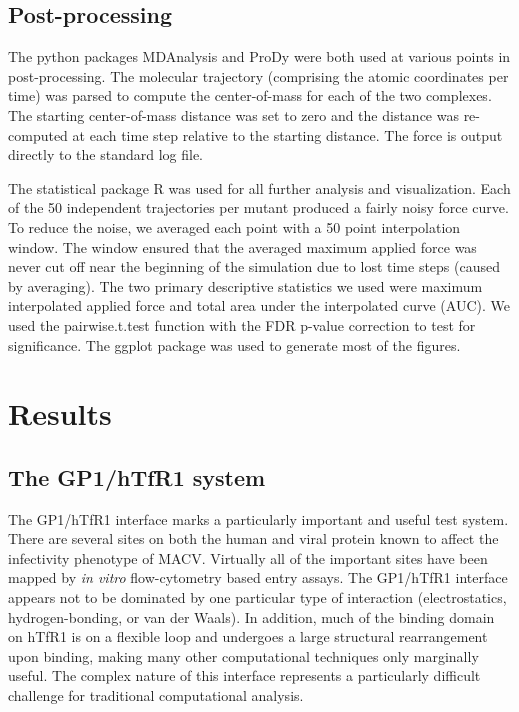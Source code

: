 \documentclass[12pt]{article}
\begin{document}
\subsection*{Post-processing}

The python packages MDAnalysis \citep{Agrawal2011} and ProDy \citep{Bakan2011} were both used at various points in post-processing. The molecular trajectory (comprising the atomic coordinates per time) was parsed to compute the center-of-mass for each of the two complexes. The starting center-of-mass distance was set to zero and the distance was re-computed at each time step relative to the starting distance. The force is output directly to the standard log file.

The statistical package R was used for all further analysis and visualization. Each of the 50 independent trajectories per mutant produced a fairly noisy force curve. To reduce the noise, we averaged each point with a 50 point interpolation window. The window ensured that the averaged maximum applied force was never cut off near the beginning of the simulation due to lost time steps (caused by averaging). The two primary descriptive statistics we used were maximum interpolated applied force and total area under the interpolated curve (AUC). We used the pairwise.t.test function with the FDR p-value correction to test for significance. The ggplot \citep{ggplot} package was used to generate most of the figures. 

\section*{Results}

\subsection*{The GP1/hTfR1 system}
The GP1/hTfR1 interface marks a particularly important and useful test system. There are several sites on both the human and viral protein known to affect the infectivity phenotype of MACV. Virtually all of the important sites have been mapped by \textit{in vitro} flow-cytometry based entry assays. The GP1/hTfR1 interface appears not to be dominated by one particular type of interaction (electrostatics, hydrogen-bonding, or van der Waals). In addition, much of the binding domain on hTfR1 is on a flexible loop and undergoes a large structural rearrangement upon binding, making many other computational techniques \citep{Grant2011,Kortemme2004} only marginally useful. The complex nature of this interface represents a particularly difficult challenge for traditional computational analysis. 
\end{document}
